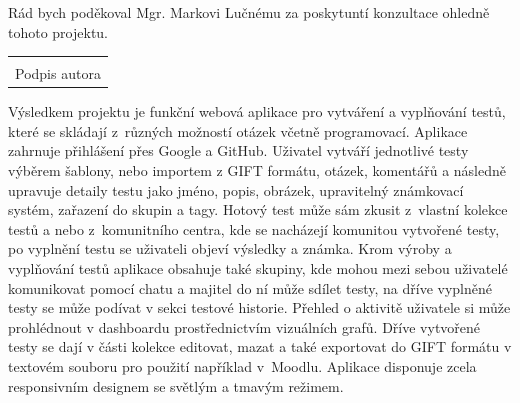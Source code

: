\documentclass[12pt, a4paper,
openright
]{report}
\newcommand\datumOdevzdani{1. 1. 2024} %
\begin{document}
\cleardoublepage %
	

	
	\noindent Rád bych poděkoval Mgr. Markovi Lučnému za poskytuntí konzultace ohledně tohoto projektu.
	
	\vspace*{0.7\textheight} %

	\vfill
	\noindent{V Opavě \datumOdevzdani\\}
	\noindent
	\begin{minipage}{\linewidth}
		\hspace{9.5cm} 
		\begin{tabular}{@{}p{6cm}@{}}
			\dotfill \\
			Podpis autora
		\end{tabular}
	\end{minipage}
	
	\cleardoublepage %


	\noindent Výsledkem projektu je funkční webová aplikace pro vytváření a vyplňování testů, které se skládají z~různých možností otázek včetně programovací. Aplikace zahrnuje přihlášení přes Google a GitHub. Uživatel vytváří jednotlivé testy výběrem šablony, nebo importem z GIFT formátu, otázek, komentářů a následně upravuje detaily testu jako jméno, popis, obrázek, upravitelný známkovací systém, zařazení do skupin a tagy. Hotový test může sám zkusit z~vlastní kolekce testů a nebo z~komunitního centra, kde se nacházejí komunitou vytvořené testy, po vyplnění testu se uživateli objeví výsledky a známka. Krom výroby a vyplňování testů aplikace obsahuje také skupiny, kde mohou mezi sebou uživatelé komunikovat pomocí chatu a majitel do ní může sdílet testy, na dříve vyplněné testy se může podívat v sekci testové historie. Přehled o aktivitě uživatele si může prohlédnout v dashboardu prostřednictvím vizuálních grafů. Dříve vytvořené testy se dají v části kolekce editovat, mazat a také exportovat do GIFT formátu v textovém souboru pro použití například v~Moodlu. Aplikace disponuje zcela responsivním designem se světlým a tmavým režimem.
	
\end{document}
